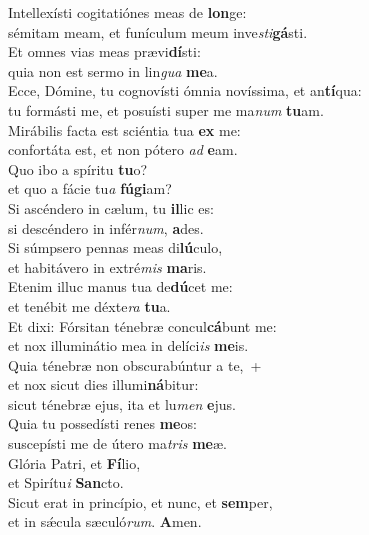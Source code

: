 \evenverse Intellexísti cogitatiónes meas de \textbf{lon}ge:~\*\\
\evenverse sémitam meam, et funículum meum inve\textit{sti}\textbf{gá}sti.\\
\oddverse Et omnes vias meas prævi\textbf{dí}sti:~\*\\
\oddverse quia non est sermo in lin\textit{gua} \textbf{me}a.\\
\evenverse Ecce, Dómine, tu cognovísti ómnia novíssima, et an\textbf{tí}qua:~\*\\
\evenverse tu formásti me, et posuísti super me ma\textit{num} \textbf{tu}am.\\
\oddverse Mirábilis facta est sciéntia tua \textbf{ex} me:~\*\\
\oddverse confortáta est, et non pótero \textit{ad} \textbf{e}am.\\
\evenverse Quo ibo a spíritu \textbf{tu}o?~\*\\
\evenverse et quo a fácie tu\textit{a} \textbf{fú}\textbf{gi}am?\\
\oddverse Si ascéndero in cælum, tu \textbf{il}lic es:~\*\\
\oddverse si descéndero in infér\textit{num}, \textbf{a}des.\\
\evenverse Si súmpsero pennas meas di\textbf{lú}culo,~\*\\
\evenverse et habitávero in extré\textit{mis} \textbf{ma}ris.\\
\oddverse Etenim illuc manus tua de\textbf{dú}cet me:~\*\\
\oddverse et tenébit me déxte\textit{ra} \textbf{tu}a.\\
\evenverse Et dixi: Fórsitan ténebræ concul\textbf{cá}bunt me:~\*\\
\evenverse et nox illuminátio mea in delíci\textit{is} \textbf{me}is.\\
\oddverse Quia ténebræ non obscurabúntur a te,~+\\
\oddverse  et nox sicut dies illumi\textbf{ná}bitur:~\*\\
\oddverse sicut ténebræ ejus, ita et lu\textit{men} \textbf{e}jus.\\
\evenverse Quia tu possedísti renes \textbf{me}os:~\*\\
\evenverse suscepísti me de útero ma\textit{tris} \textbf{me}æ.\\
\oddverse Glória Patri, et \textbf{Fí}lio,~\*\\
\oddverse et Spirítu\textit{i} \textbf{San}cto.\\
\evenverse Sicut erat in princípio, et nunc, et \textbf{sem}per,~\*\\
\evenverse et in sǽcula sæculó\textit{rum}. \textbf{A}men.\\
